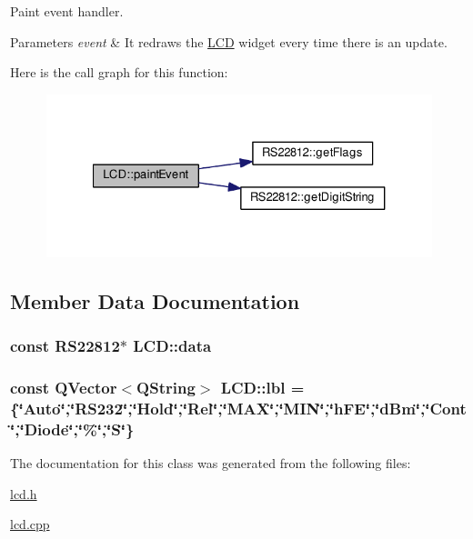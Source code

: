 Paint event handler. 


\begin{DoxyParams}{Parameters}
{\em event} & It redraws the \hyperlink{class_l_c_d}{L\-C\-D} widget every time there is an update. \\
\hline
\end{DoxyParams}


Here is the call graph for this function\-:
\nopagebreak
\begin{figure}[H]
\begin{center}
\leavevmode
\includegraphics[width=327pt]{class_l_c_d_a259fac152add9afdeb4543af4998d14b_cgraph}
\end{center}
\end{figure}




\subsection{Member Data Documentation}
\hypertarget{class_l_c_d_a04c1fe4d60f692978d1d428521e2d2a2}{
\subsubsection[{data}]{\setlength{\rightskip}{0pt plus 5cm}const {\bf R\-S22812}$\ast$ L\-C\-D\-::data\hspace{0.3cm}{\ttfamily [private]}}}\label{class_l_c_d_a04c1fe4d60f692978d1d428521e2d2a2}
\hypertarget{class_l_c_d_a80e55f48f0e7c7b791fe1602640f708a}{
\subsubsection[{lbl}]{\setlength{\rightskip}{0pt plus 5cm}const Q\-Vector$<$Q\-String$>$ L\-C\-D\-::lbl =\{\char`\"{}Auto\char`\"{},\char`\"{}R\-S232\char`\"{},\char`\"{}Hold\char`\"{},\char`\"{}Rel\char`\"{},\char`\"{}M\-A\-X\char`\"{},\char`\"{}M\-I\-N\char`\"{},\char`\"{}h\-F\-E\char`\"{},\char`\"{}d\-Bm\char`\"{},\char`\"{}Cont\char`\"{},\char`\"{}Diode\char`\"{},\char`\"{}\%\char`\"{},\char`\"{}S\char`\"{}\}\hspace{0.3cm}{\ttfamily [private]}}}\label{class_l_c_d_a80e55f48f0e7c7b791fe1602640f708a}


The documentation for this class was generated from the following files\-:\begin{DoxyCompactItemize}
\item 
\hyperlink{lcd_8h}{lcd.\-h}\item 
\hyperlink{lcd_8cpp}{lcd.\-cpp}\end{DoxyCompactItemize}
